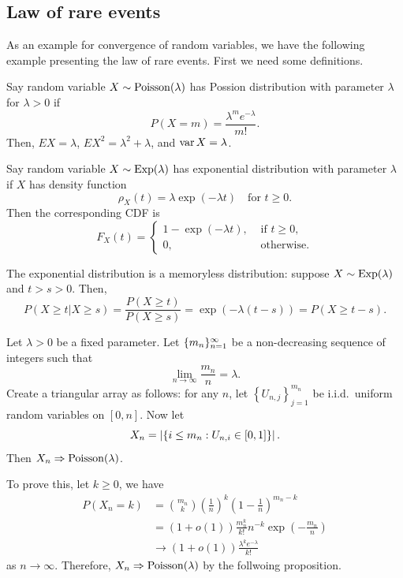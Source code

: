 \documentclass[a4paper]{article}
\newcommand{\convd}{\Rightarrow}
\begin{document}
\subsection{Law of rare events}

As an example for convergence of random variables, we have the following
example presenting the law of rare events. First we need some definitions.

\begin{defi}
  Say random variable $X \sim \operatorname{Poisson} (\lambda)$ has Possion distribution
  with parameter $\lambda$ for $\lambda > 0$ if
  \[
    P \left( X = m \right) = \frac{\lambda^m e^{- \lambda}}{m!}.
  \]
  Then, $E X = \lambda$, $E X^2 = \lambda^2 + \lambda$, and
  $\operatorname{var} X = \lambda$.
\end{defi}

\begin{defi}
  Say random variable $X \sim \operatorname{Exp} (\lambda)$ has exponential distribution
  with parameter $\lambda$ if $X$ has density function
  \[
    \rho_X (t) = \lambda \exp (- \lambda t) \quad \text{for $t \geq 0$.}
  \]
  Then the corresponding CDF is
  \[
    F_X (t) = \begin{cases}
    1 - \exp (- \lambda t), & \text{ if $t \geq 0$,} \\
    0, & \text{ otherwise.}
    \end{cases}
  \]
\end{defi}

The exponential distribution is a memoryless distribution: suppose
$X \sim \operatorname{Exp} (\lambda)$ and $t > s > 0$. Then,
\[
  P \left( X \geq t | X \geq s \right)
  = \frac{P \left( X \geq t \right)}{P \left( X \geq s \right)}
  = \exp (- \lambda (t - s))
  = P \left( X \geq t - s \right).
\]

\begin{eg}
  Let $\lambda > 0$ be a fixed parameter. Let $\{ m_n \}_{n=1}^\infty$
  be a non-decreasing sequence of integers such that
  \[
    \lim_{n \to \infty} \frac{m_n}{n} = \lambda.
  \]
  Create a triangular array as follows: for any $n$,
  let $\left\{ U_{n, j} \right\}_{j=1}^{m_n}$ be i.i.d.\ uniform random
  variables on $[0, n]$. Now let
  \[
    X_n = \left\lvert  \left\{ i \leq m_n : U_{n, i} \in [0, 1] \right\} \right\rvert.
  \]
  Then $X_n \convd \Poisson (\lambda)$.

  To prove this, let $k \geq 0$, we have
  \begin{align*}
    P (X_n = k)
     & = \binom{m_n}{k} \left( \frac{1}{n} \right)^k
    \left( 1 - \frac{1}{n} \right)^{m_n - k}                                    \\
     & = (1 + o(1)) \frac{m_n^k}{k!} n^{-k} \exp \left( - \frac{m_n}{n} \right) \\
     & \to (1 + o(1)) \frac{\lambda^k e^{- \lambda}}{k!}
  \end{align*}
  as $n \to \infty$. Therefore, $X_n \convd \Poisson (\lambda)$ by the
  follwoing proposition.

\end{eg}
\end{document}
